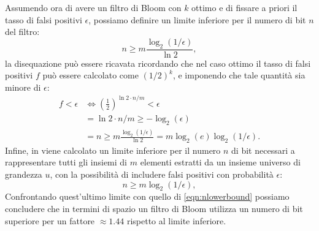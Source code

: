 \documentclass[../../main.tex]{subfiles}
\begin{document}
Assumendo ora di avere un filtro di Bloom con $k$ ottimo e di fissare a priori il tasso di falsi positivi $\epsilon$, possiamo definire un limite inferiore per il numero di bit $n$ del filtro: 
\begin{equation}
    n \geq m \frac{\log_2(1/\epsilon)}{\ln2},
    \label{eqn:nlowerbound}
\end{equation}
la disequazione può essere ricavata ricordando che nel caso ottimo il tasso di falsi positivi $f$ può essere calcolato come $\left(1/2\right)^k$, e imponendo che tale quantità sia minore di $\epsilon$:
\begin{align*}
    f < \epsilon &\Leftrightarrow \left(\frac{1}{2}\right)^{\ln2 \cdot n/m} < \epsilon\\
    &= \ln2 \cdot n/m \geq - \log_2(\epsilon) \\
    &= n \geq m \frac{\log_2(1/\epsilon)}{\ln2} = m \log_2(e) \log_2(1/\epsilon) .
\end{align*}
Infine, in \cite{Broder2005} viene calcolato un limite inferiore per il numero $n$ di bit necessari a rappresentare tutti gli insiemi di $m$ elementi estratti da un insieme universo di grandezza $u$, con la possibilità di includere falsi positivi con probabilità $\epsilon$:
\[n \geq m \log_2(1/\epsilon),\]
Confrontando quest'ultimo limite con quello di \eqref{eqn:nlowerbound} possiamo concludere che in termini di spazio un filtro di Bloom utilizza un numero di bit superiore per un fattore $\approx 1.44$ rispetto al limite inferiore.
\end{document}

